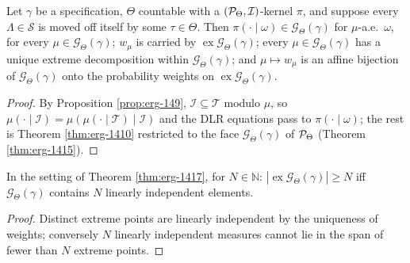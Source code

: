 \begin{theorem}[Georgii (14.17)]
    \label{thm:erg-1417}
    \leanok

    Let $\gamma$ be a specification, $\Theta$ countable with a $(\mathcal{P}_\Theta, \mathcal I)$-kernel
    $\pi$, and suppose every $\Lambda \in \mathcal S$ is moved off itself by some
    $\tau \in \Theta$. Then $\pi(\cdot \mid \omega) \in \mathcal G_\Theta(\gamma)$ for
    $\mu$-a.e.\ $\omega$, for every $\mu \in \mathcal G_\Theta(\gamma)$; $w_\mu$ is carried by
    $\operatorname{ex}\mathcal G_\Theta(\gamma)$; every $\mu \in \mathcal G_\Theta(\gamma)$ has a
    unique extreme decomposition within $\mathcal G_\Theta(\gamma)$; and $\mu \mapsto w_\mu$ is an
    affine bijection of $\mathcal G_\Theta(\gamma)$ onto the probability weights on
    $\operatorname{ex}\mathcal G_\Theta(\gamma)$.
\end{theorem}
\begin{proof}
    \leanok
    By Proposition \ref{prop:erg-149}, $\mathcal I \subseteq \mathcal T$ modulo $\mu$, so
    $\mu(\cdot \mid \mathcal I) = \mu(\mu(\cdot \mid \mathcal T) \mid \mathcal I)$ and the DLR
    equations pass to $\pi(\cdot \mid \omega)$; the rest is Theorem \ref{thm:erg-1410} restricted
    to the face $\mathcal G_\Theta(\gamma)$ of $\mathcal{P}_\Theta$ (Theorem \ref{thm:erg-1415}).
\end{proof}

\begin{corollary}[Georgii (14.18)]
    \label{cor:erg-1418}
    \leanok

    In the setting of Theorem \ref{thm:erg-1417}, for $N \in \mathbb N$:
    $|\operatorname{ex}\mathcal G_\Theta(\gamma)| \geq N$ iff $\mathcal G_\Theta(\gamma)$
    contains $N$ linearly independent elements.
\end{corollary}
\begin{proof}
    \leanok
    Distinct extreme points are linearly independent by the uniqueness of weights; conversely
    $N$ linearly independent measures cannot lie in the span of fewer than $N$ extreme points.
\end{proof}

